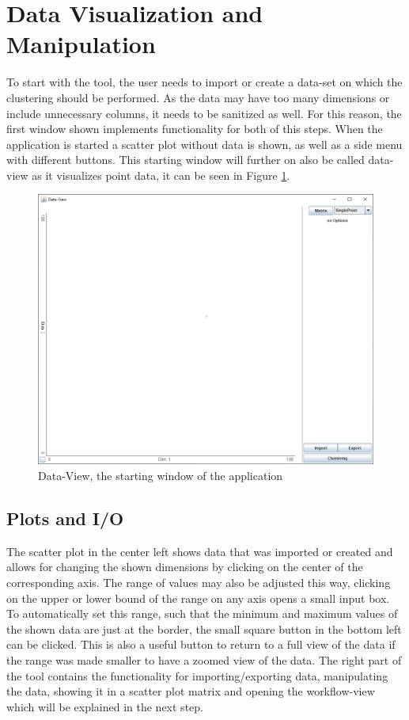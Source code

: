 \documentclass[
	a4paper,
	english,
	twoside,
	openright,               
	11pt                            
	]{report}
\begin{document}
\section{Data Visualization and Manipulation}
To start with the tool, the user needs to import or create a data-set on which the clustering should be performed. As the data may have too many dimensions or include unnecessary columns, it needs to be sanitized as well. For this reason, the first window shown implements functionality for both of this steps. When the application is started a scatter plot without data is shown, as well as a side menu with different buttons. This starting window will further on also be called data-view as it visualizes point data, it can be seen in Figure \ref{fig:data-view}. 

\begin{figure}[h]
	\centering
	\includegraphics[scale=.45]{data-view}
	\caption{Data-View, the starting window of the application}
	\label{fig:data-view}
\end{figure}

\subsection{Plots and I/O}\label{sec:plotio}

The scatter plot in the center left shows data that was imported or created and allows for changing the shown dimensions by clicking on the center of the corresponding axis. The range of values may also be adjusted this way, clicking on the upper or lower bound of the range on any axis opens a small input box. To automatically set this range, such that the minimum and maximum values of the shown data are just at the border, the small square button in the bottom left can be clicked. This is also a useful button to return to a full view of the data if the range was made smaller to have a zoomed view of the data. The right part of the tool contains the functionality for importing/exporting data, manipulating the data, showing it in a scatter plot matrix and opening the workflow-view which will be explained in the next step.
\end{document}
